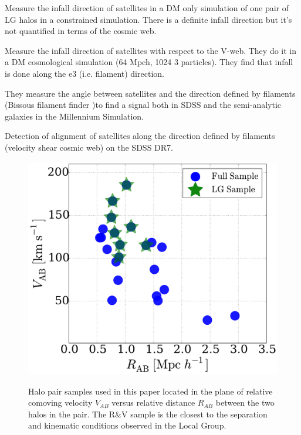 \documentclass{emulateapj}
\begin{document}
\citep{2011MNRAS.411.1525L} Measure the infall direction of satellites
in a DM only simulation of one pair of LG halos in a constrained
simulation. There is a definite infall direction but it's not
quantified in terms of the cosmic web.
 
\citep{2014MNRAS.443.1274L} Measure the infall direction of satellites
with respect to the V-web. They do it in a DM cosmological simulation
(64 Mpch, 1024 3 particles). They find that infall is done along the
e3 (i.e. filament) direction.

\citep{2015MNRAS.450.2727T} They measure the angle between satellites
and the direction defined by filaments (Bissous filament finder )to
find a signal both in SDSS and the semi-analytic galaxies in the
Millennium Simulation.  

\citep{2015ApJ...799..212L} Detection of alignment of satellites along
the direction defined by filaments (velocity shear cosmic web) on the
SDSS DR7.



\begin{figure}
\centering
\includegraphics[width=\hsize]{v_r_pairs.pdf}\\
\caption{Halo pair samples used in this paper located in the
  plane of relative comoving velocity $V_{AB}$ versus relative
  distance $R_{AB}$ between the two halos in the pair.
  The R\&V sample is the closest to the separation and kinematic
  conditions observed in the Local Group.} 
\label{fig:samples}
\end{figure}
\end{document}
